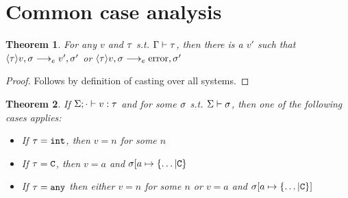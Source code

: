 \documentclass{report}
\newtheorem{thm}{Theorem}
\begin{document}
\section{Common case analysis}
\begin{thm} 
\label{castv}For any $v$ and $\tau$ s.t. $\Gamma\vdash \tau$, then there is a $v'$ such that $\langle \tau\rangle v,\sigma \longrightarrow_{e} v',\sigma'$ or $\langle \tau\rangle v,\sigma \longrightarrow_{e} \text{error},\sigma'$\end{thm}
\begin{proof}
Follows by definition of casting over all systems.
\end{proof}

\begin{thm}
\label{canonforms}If $\Sigma;\cdot \vdash v : \tau$ and for some $\sigma$ s.t. $\Sigma \vdash \sigma$, then one of the following cases applies:
\begin{itemize}
\item If $\tau = \texttt{int}$, then $v = n$ for some $n$
\item If $\tau = \texttt{C}$, then $v = a$ and $\sigma[a \mapsto \{\ldots | \texttt{C} \}$
\item If $\tau = \texttt{any}$ then either $v = n$ for some $n$ or $v = a$ and $\sigma[a \mapsto \{\ldots | \texttt{C} \}]$
\end{itemize}
\end{thm}
\end{document}
